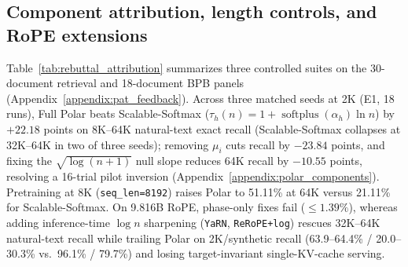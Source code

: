 \documentclass{article}
\newenvironment{revblock}{\color{revcolor}}{}
\begin{document}
\subsection{Component attribution, length controls, and RoPE extensions}
\label{sec:component_attribution}
\begin{revblock}
Table~\ref{tab:rebuttal_attribution} summarizes three controlled suites on the 30-document retrieval and 18-document BPB panels (Appendix~\ref{appendix:pat_feedback}). Across three matched seeds at 2K (E1, 18 runs), Full Polar beats Scalable-Softmax ($\tau_h(n)=1+\operatorname{softplus}(\alpha_h)\ln n$) by $+22.18$ points on 8K--64K natural-text exact recall (Scalable-Softmax collapses at 32K--64K in two of three seeds); removing $\mu_i$ cuts recall by $-23.84$ points, and fixing the $\sqrt{\log(n+1)}$ null slope reduces 64K recall by $-10.55$ points, resolving a 16-trial pilot inversion (Appendix~\ref{appendix:polar_components}). Pretraining at 8K (\texttt{seq\_len=8192}) raises Polar to 51.11\% at 64K versus 21.11\% for Scalable-Softmax. On 9.816B RoPE, phase-only fixes fail ($\le1.39\%$), whereas adding inference-time $\log n$ sharpening (\texttt{YaRN}, \texttt{ReRoPE+log}) rescues 32K--64K natural-text recall while trailing Polar on 2K/synthetic recall (63.9--64.4\% / 20.0--30.3\% vs.\ 96.1\% / 79.7\%) and losing target-invariant single-KV-cache serving.
\end{revblock}
\end{document}
